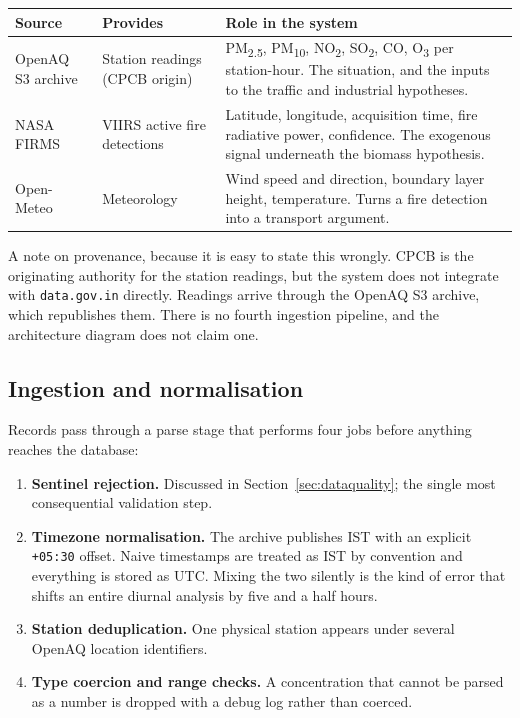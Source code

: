 \documentclass[11pt,a4paper]{article}
\newcommand{\code}[1]{\texttt{\small #1}}
\newcommand{\NOx}{NO\textsubscript{2}}
\newcommand{\SOx}{SO\textsubscript{2}}
\newcommand{\PM}{PM\textsubscript{2.5}}
\begin{document}
\begin{center}
\small
\begin{tabularx}{\linewidth}{@{}l l X@{}}
\toprule
\textbf{Source} & \textbf{Provides} & \textbf{Role in the system} \\
\midrule
OpenAQ S3 archive & Station readings (CPCB origin) & \PM{}, PM\textsubscript{10},
\NOx{}, \SOx{}, CO, O\textsubscript{3} per station-hour. The situation, and the
inputs to the traffic and industrial hypotheses. \\
NASA FIRMS & VIIRS active fire detections & Latitude, longitude, acquisition time,
fire radiative power, confidence. The exogenous signal underneath the biomass
hypothesis. \\
Open-Meteo & Meteorology & Wind speed and direction, boundary layer height,
temperature. Turns a fire detection into a transport argument. \\
\bottomrule
\end{tabularx}
\end{center}

\noindent
A note on provenance, because it is easy to state this wrongly. CPCB is the
originating authority for the station readings, but the system does not integrate
with \code{data.gov.in} directly. Readings arrive through the OpenAQ S3 archive,
which republishes them. There is no fourth ingestion pipeline, and the architecture
diagram does not claim one.

\subsection{Ingestion and normalisation}

Records pass through a parse stage that performs four jobs before anything reaches
the database:

\begin{enumerate}
  \item \textbf{Sentinel rejection.} Discussed in
  Section~\ref{sec:dataquality}; the single most consequential validation step.
  \item \textbf{Timezone normalisation.} The archive publishes IST with an explicit
  \code{+05:30} offset. Naive timestamps are treated as IST by convention and
  everything is stored as UTC. Mixing the two silently is the kind of error that
  shifts an entire diurnal analysis by five and a half hours.
  \item \textbf{Station deduplication.} One physical station appears under several
  OpenAQ location identifiers.
  \item \textbf{Type coercion and range checks.} A concentration that cannot be
  parsed as a number is dropped with a debug log rather than coerced.
\end{enumerate}
\end{document}
